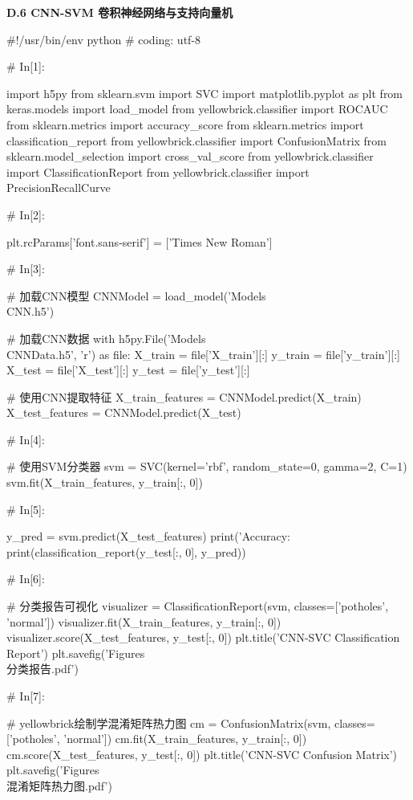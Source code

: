 \documentclass{MathorCupmodeling}
\begin{document}
\textbf{D.6 CNN-SVM 卷积神经网络与支持向量机}
\begin{python}
#!/usr/bin/env python
# coding: utf-8

# In[1]:


import h5py
from sklearn.svm import SVC
import matplotlib.pyplot as plt
from keras.models import load_model
from yellowbrick.classifier import ROCAUC
from sklearn.metrics import accuracy_score
from sklearn.metrics import classification_report
from yellowbrick.classifier import ConfusionMatrix
from sklearn.model_selection import cross_val_score
from yellowbrick.classifier import ClassificationReport
from yellowbrick.classifier import PrecisionRecallCurve

# In[2]:


plt.rcParams['font.sans-serif'] = ['Times New Roman']

# In[3]:


# 加载CNN模型
CNNModel = load_model('Models\\CNN.h5')

# 加载CNN数据
with h5py.File('Models\\CNNData.h5', 'r') as file:
    X_train = file['X_train'][:]
    y_train = file['y_train'][:]
    X_test = file['X_test'][:]
    y_test = file['y_test'][:]

# 使用CNN提取特征
X_train_features = CNNModel.predict(X_train)
X_test_features = CNNModel.predict(X_test)

# In[4]:


# 使用SVM分类器
svm = SVC(kernel='rbf', random_state=0, gamma=2, C=1)
svm.fit(X_train_features, y_train[:, 0])

# In[5]:


y_pred = svm.predict(X_test_features)
print('Accuracy: %
print(classification_report(y_test[:, 0], y_pred))

# In[6]:


# 分类报告可视化
visualizer = ClassificationReport(svm, classes=['potholes', 'normal'])
visualizer.fit(X_train_features, y_train[:, 0])
visualizer.score(X_test_features, y_test[:, 0])
plt.title('CNN-SVC Classification Report')
plt.savefig('Figures\\[CNN-SVC]分类报告.pdf')

# In[7]:


# yellowbrick绘制学混淆矩阵热力图
cm = ConfusionMatrix(svm, classes=['potholes', 'normal'])
cm.fit(X_train_features, y_train[:, 0])
cm.score(X_test_features, y_test[:, 0])
plt.title('CNN-SVC Confusion Matrix')
plt.savefig('Figures\\[CNN-SVC]混淆矩阵热力图.pdf')


\end{python}
\end{document}
